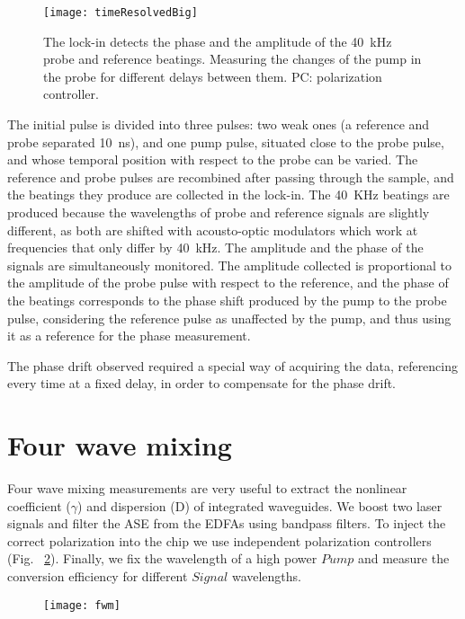 \begin{figure}[htb]
    \centering
    \texttt{[image: timeResolvedBig]}
    \caption{The lock-in detects the phase and the amplitude of the 40~kHz probe and reference beatings. Measuring the changes of the pump in the probe for different delays between them. PC: polarization controller. }
    \label{fig:timeResSetupTesis}
\end{figure}

The initial pulse is divided into three pulses: two weak ones (a reference and probe separated 10~ns), and one pump pulse, situated close to the probe pulse, and whose temporal position with respect to the probe can be varied. The reference and probe pulses are recombined after passing through the sample, and the beatings they produce are collected in the lock-in. The 40~KHz beatings  are produced because the wavelengths of probe and reference signals are slightly different, as both are shifted with acousto-optic modulators which work at frequencies that only differ by 40~kHz. The amplitude and the phase of the signals are simultaneously monitored.
The amplitude collected is proportional to the amplitude of the probe pulse with respect to the reference, and the phase of the beatings corresponds to the phase shift produced by the pump to the probe pulse, considering the reference pulse as unaffected by the pump, and thus using it as a reference for the phase measurement. 

The phase drift observed required a special way of acquiring the data, referencing every time at a fixed delay, in order to compensate for the phase drift.

\section{Four wave mixing}
\label{ch:fwm}
Four wave mixing measurements are very useful to extract the nonlinear coefficient ($\gamma$) and dispersion (D) of integrated waveguides.
We boost two laser signals and filter the ASE from the EDFAs using bandpass filters.
To inject the correct polarization into the chip we use independent polarization controllers (Fig.~ \ref{setup}).
Finally, we fix the wavelength of a high power $Pump$ and measure the conversion efficiency for different $Signal$ wavelengths.  


\begin{figure}[htb]
	\centering
	\texttt{[image: fwm]}
	\label{setup}
\end{figure}


